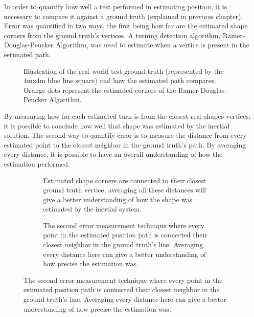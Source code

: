In order to quantify how well a test performed in estimating position, it is necessary to compare it against a ground truth (explained in previous chapter). Error was quantified in two ways, the first being how far are the estimated shape corners from the ground truth's vertices. A turning detection algorithm, Ramer-Douglas-Peucker Algorithm, was used to estimate when a vertice is present in the estimated path.

\begin{figure}[!h]
    \centering
    \resizebox{0.8\linewidth}{!}{}
    \caption{Illustration of the real-world test ground truth (represented by the 4mx4m  blue line square) and how the estimated path compares. Orange dots represent the estimated corners of the Ramer-Douglas-Peucker Algorithm. }
    \label{fig:square_truth}
\end{figure}

By measuring how far each estimated turn is from the closest real shapes vertices, it is possible to conclude how well that shape was estimated by the inertial solution.
The second way to quantify error is to measure the distance from every estimated point to the closest neighbor in the ground truth's path. By averaging every distance, it is possible to have an overall understanding of how the estimation performed.

\begin{figure}[!h]
    \centering
    \begin{subfigure}{0.75\textwidth}
        \centering
        \resizebox{1\linewidth}{!}{}
        \caption{Estimated shape corners are connected to their closest ground truth vertice, averaging all these distances will give a better understanding of how the shape was estimated by the inertial system.}
        \label{fig:square_turn}
    \end{subfigure}

    \begin{subfigure}{0.75\textwidth}
        \centering
        \resizebox{1\linewidth}{!}{}
        \caption{The second error measurement technique where every point in the estimated position path is connected their closest neighbor in the ground truth's line. Averaging every distance here can give a better understanding of how precise the estimation was.}
        \label{fig:square_point}
    \end{subfigure}
    \label{fig:error_methods}
\end{figure}


